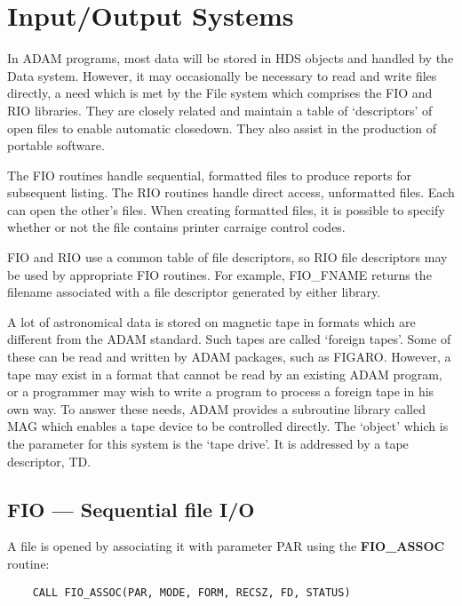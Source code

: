 \chapter{Input/Output Systems}
\label{C_iosys}

In ADAM programs, most data will be stored in HDS objects and handled by the
Data system.
However, it may occasionally be necessary  to read and write files directly, a
need which is met by the File system which comprises the FIO and RIO libraries.
They are closely related and maintain a table of `descriptors' of open files to
enable automatic closedown.
They also assist in the production of portable software.

The FIO routines handle sequential, formatted files to produce reports for
subsequent listing.
The RIO routines handle direct access, unformatted files.
Each can open the other's files.
When creating formatted files, it is possible to specify whether or not the file
contains printer carraige control codes.

FIO and RIO use a common table of file descriptors, so RIO file descriptors
may be used by appropriate FIO routines.
For example, FIO\_FNAME returns the filename associated with a file descriptor
generated by either library.

A lot of astronomical data is stored on magnetic tape in formats which are
different from the ADAM standard.
Such tapes are called `foreign tapes'.
Some of these can be read and written by ADAM packages, such as FIGARO.
However, a tape may exist in a format that cannot be read by an existing
ADAM program, or a programmer may wish to write a program to process a foreign
tape in his own way.
To answer these needs, ADAM provides a subroutine library called MAG which
enables a tape device to be controlled directly.
The `object' which is the parameter for this system is the `tape drive'.
It is addressed by a tape descriptor, TD.

\section{FIO --- Sequential file I/O}
\label{S_fio}

A file is opened by associating it with parameter 
PAR using the {\bf FIO\_ASSOC}
routine:

\begin{small}
\begin{verbatim}
    CALL FIO_ASSOC(PAR, MODE, FORM, RECSZ, FD, STATUS)
\end{verbatim}
\end{small}

